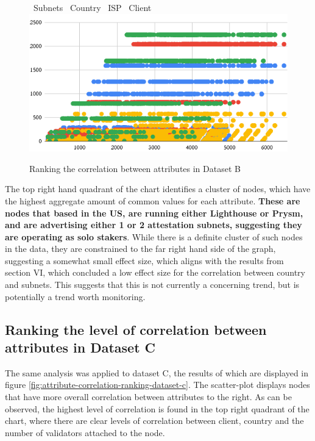 \documentclass[conference]{IEEEtran}
\begin{document}
\begin{figure}[htbp]
    \centering
    \LARGE \textcolor{bluebullet}\textbullet\ \normalsize Subnets %
    \LARGE \textcolor{redbullet}\textbullet\ \normalsize Country %
    \LARGE \textcolor{yellowbullet}\textbullet\ \normalsize ISP %
    \LARGE \textcolor{greenbullet}\textbullet\ \normalsize Client
    \includegraphics[width=1\linewidth]{figures/chart-7.png}
    \caption{Ranking the correlation between attributes in Dataset B}
    \label{fig:attribute-correlation-ranking-dataset-b}
\end{figure}

The top right hand quadrant of the chart identifies a cluster of nodes, which have the highest aggregate amount of common values for each attribute.  \textbf{These are nodes that based in the US, are running either Lighthouse or Prysm, and are advertising either 1 or 2 attestation subnets, suggesting they are operating as solo stakers}.  While there is a definite cluster of such nodes in the data, they are constrained to the far right hand side of the graph, suggesting a somewhat small effect size, which aligns with the results from section VI, which concluded a low effect size for the correlation between country and subnets.  This suggests that this is not currently a concerning trend, but is potentially a trend worth monitoring.

\subsection{Ranking the level of correlation between attributes in Dataset C}

The same analysis was applied to dataset C, the results of which are displayed in figure \ref{fig:attribute-correlation-ranking-dataset-c}.  The scatter-plot displays nodes that have more overall correlation between attributes to the right.  As can be observed, the highest level of correlation is found in the top right quadrant of the chart, where there are clear levels of correlation between client, country and the number of validators attached to the node. %
\end{document}
